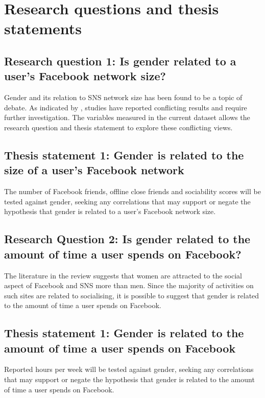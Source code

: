 \section{Research questions and thesis statements}

\subsection{Research question 1: Is gender related to a user's Facebook network size?}

Gender and its relation to SNS network size has been found to be a topic of debate. As indicated by \citet{Tifferet2014}, studies have reported conflicting results and require further investigation. The variables measured in the current dataset allows the research question and thesis statement to explore these conflicting views.

\subsection{Thesis statement 1: Gender is related to the size of a user's Facebook network}

The number of Facebook friends, offline close friends and sociability scores will be tested against gender, seeking any correlations that may support or negate the hypothesis that gender is related to a user's Facebook network size. 

\subsection{Research Question 2: Is gender related to the amount of time a user spends on Facebook?}

The literature in the review suggests that women are attracted to the social aspect of Facebook and SNS more than men. Since the majority of activities on such sites are related to socialising, it is possible to suggest that gender is related to the amount of time a user spends on Facebook.

\subsection{Thesis statement 1: Gender is related to the amount of time a user spends on Facebook}

Reported hours per week will be tested against gender, seeking any correlations that may support or negate the hypothesis that gender is related to the amount of time a user spends on Facebook.